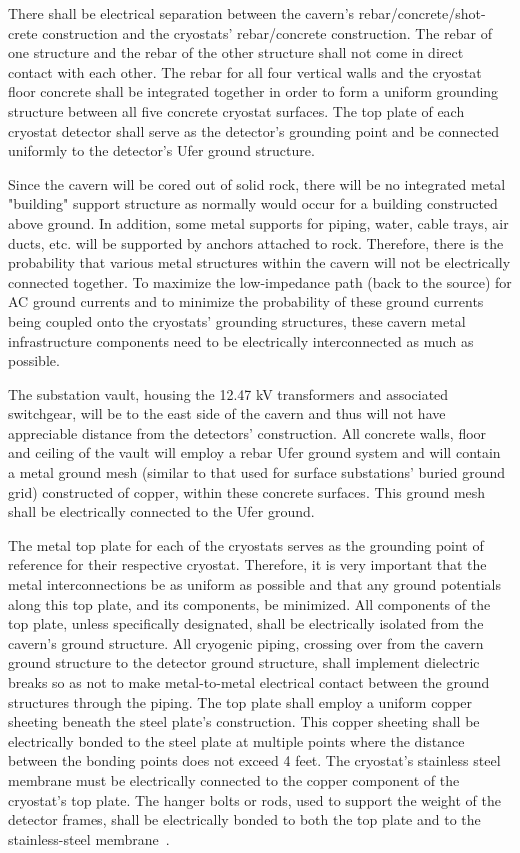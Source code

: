 There shall be electrical separation between the cavern's rebar/concrete/shot-crete construction and the cryostats' rebar/concrete construction. The rebar of one structure and the rebar of the other structure 
shall not come in direct contact with each other. The rebar for all four vertical walls and the cryostat floor concrete shall be integrated together in order to form a uniform grounding structure between all five 
concrete cryostat surfaces. The top plate of each cryostat detector shall serve as the detector's grounding point and be connected uniformly to the detector's Ufer ground structure.

Since the cavern will be cored out of solid rock, there will be no integrated metal "building" support structure as normally would occur for a building constructed above ground. In addition, some metal 
supports for piping, water, cable trays, air ducts, etc. will be supported by anchors attached to rock. Therefore, there is the probability that various metal structures within the cavern will not be electrically 
connected together. To maximize the low-impedance path (back to the source) for AC ground currents and to minimize the probability of these ground currents being coupled onto the cryostats' grounding 
structures, these cavern metal infrastructure components need to be electrically interconnected as much as possible. 

The substation vault, housing the 12.47 kV transformers and associated switchgear, will be to the east side of the cavern and thus will not have appreciable distance from the detectors' construction. All 
concrete walls, floor and ceiling of the vault will employ a rebar Ufer ground system and will contain a metal ground mesh (similar to that used for surface substations' buried ground grid) constructed of 
copper, within these concrete surfaces. This ground mesh shall be electrically connected to the Ufer ground.

The metal top plate for each of the cryostats serves as the grounding point of reference for their respective cryostat. Therefore, it is very important that the metal interconnections be as uniform as 
possible and that any ground potentials along this top plate, and its components, be minimized. All components of the top plate, unless specifically designated, shall be electrically isolated from the cavern's ground structure. All cryogenic piping, crossing over from the cavern ground structure to the 
detector ground structure, shall implement dielectric breaks so as not to make metal-to-metal electrical contact between the ground structures through the piping. The top plate shall employ a uniform copper 
sheeting beneath the steel plate's construction. This copper sheeting shall be electrically bonded to the steel plate at multiple points where the distance between the bonding points does not exceed 4 feet. The cryostat's stainless steel membrane must be electrically connected to the copper component of the 
cryostat's top plate. The hanger bolts or rods, used to support the weight of the detector frames, shall be 
electrically bonded to both the top plate and to the stainless-steel membrane~\cite{fd_08_7310}.

